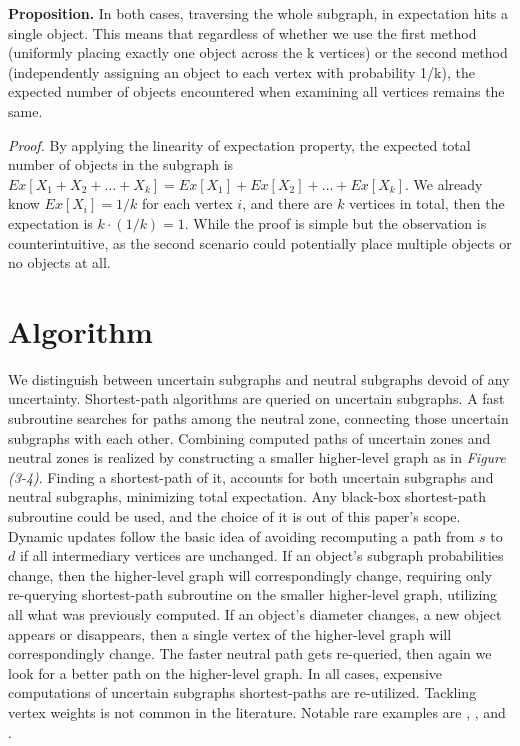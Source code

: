\documentclass[pdflatex,sn-mathphys-num]{sn-jnl}%
\begin{document}
\textbf{Proposition.} In both cases, traversing the whole subgraph, in expectation hits a single object. This means that regardless of whether we use the first method (uniformly placing exactly one object across the k vertices) or the second method (independently assigning an object to each vertex with probability 1/k), the expected number of objects encountered when examining all vertices remains the same.

\textit{Proof.} By applying the linearity of expectation property, the expected total number of objects in the subgraph is $Ex[X_1 + X_2 + \dots + X_k] = Ex[X_1] + Ex[X_2] + \dots + Ex[X_k]$. We already know $Ex[X_i] = 1/k$ for each vertex $i$, and there are $k$ vertices in total, then the expectation is $k \cdot (1/k) = 1$. While the proof is simple but the observation is counterintuitive, as the second scenario could potentially place multiple objects or no objects at all.


\section{Algorithm} \label{Algorithm}

We distinguish between uncertain subgraphs and neutral subgraphs devoid of any uncertainty. Shortest-path algorithms are queried on uncertain subgraphs. A fast subroutine searches for paths among the neutral zone, connecting those uncertain subgraphs with each other. Combining computed paths of uncertain zones and neutral zones is realized by constructing a smaller higher-level graph as in \textit{Figure (3-4)}. Finding a shortest-path of it, accounts for both uncertain subgraphs and neutral subgraphs, minimizing total expectation. Any black-box shortest-path subroutine could be used, and the choice of it is out of this paper's scope. Dynamic updates follow the basic idea of avoiding recomputing a path from $s$ to $d$ if all intermediary vertices are unchanged. If an object's subgraph probabilities change, then the higher-level graph will correspondingly change, requiring only re-querying shortest-path subroutine on the smaller higher-level graph, utilizing all what was previously computed. If an object's diameter changes, a new object appears or disappears, then a single vertex of the higher-level graph will correspondingly change. The faster neutral path gets re-queried, then again we look for a better path on the higher-level graph. In all cases, expensive computations of uncertain subgraphs shortest-paths are re-utilized. Tackling vertex weights is not common in the literature. Notable rare examples are \cite{vertexWeighted_1}, \cite{vertexWeighted_2}, and \cite{vertexWeighted_3}.
\end{document}

